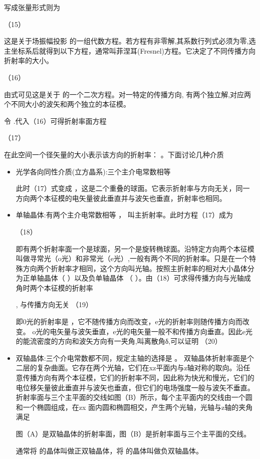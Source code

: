 写成张量形式则为

                                           （15）

这是关于场振幅投影 的一组代数方程。若方程有非零解,其系数行列式必须为零,选主坐标系后就得到以下方程，通常叫菲涅耳(Fresnel)方程。它决定了不同传播方向折射率的大小。

            （16）

由式可见这是关于 的一个二次方程。对一特定的传播方向, 有两个独立解,对应两个不同大小的波矢和两个独立的本征模。

令 .代入（16）可得折射率面方程

           （17）      

在此空间一个径矢量的大小表示该方向的折射率： 。下面讨论几种介质
\begin{itemize}[(a)]
    \item 光学各向同性介质(立方晶系):三个主介电常数相等 
    
    此时（17）式变成     ，这是二个重叠的球面。它表示折射率与方向无关，同一方向两个本征模的电矢量彼此垂直并与波矢也垂直，折射率也相同。

    \item 单轴晶体:有两个主介电常数相等  ， 叫主折射率。此时方程（17）成为
    
              （18）         
  
即有两个折射率面一个是球面，另一个是旋转椭球面。沿特定方向两个本征模叫做寻常光（o光）和非常光（e光）,一般有两个不同的折射率。只是在一个特殊方向两个折射率才相同，这个方向叫光轴。按照主折射率的相对大小晶体分为正单轴晶体（ ）以及负单轴晶体 （ ）。由（18）可求得传播方向与光轴成 角时两个本征模的折射率

              ,    与传播方向无关           （19）      

 即0光的折射率是 ，它不随传播方向而改变，e光的折射率则随传播方向而改变。 o光的电矢量与波矢垂直，e光的电矢量一般不和传播方向垂直。因此e光的能流密度的方向和波矢方向有一夹角,叫离散角δ,可以证明
                                 （20）    
    \item 双轴晶体:三个介电常数都不同，规定主轴的选择是 。   双轴晶体折射率面是个二层的复杂曲面。它存在两个光轴，它们在xz平面内与z轴对称的取向。沿任意传播方向有两个本征模，它们的折射率不同，因此称为快光和慢光，它们的电位移矢量彼此垂直并与波矢也垂直，但它们的电场强度一般与波矢不垂直。折射率面与三个主平面的交线如图（B）所示，每个主平面内的交线由一个圆和一个椭圆组成，在zx 面内圆和椭圆相交，产生两个光轴，光轴与z轴的夹角 满足
    
    图（A）是双轴晶体的折射率面，图（B）是折射率面与三个主平面的交线。
    
    通常将 的晶体叫做正双轴晶体，将 的晶体叫做负双轴晶体。
\end{itemize}

